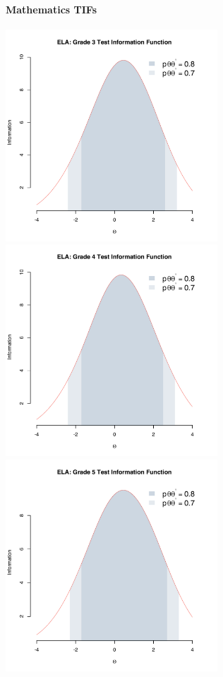 \documentclass[]{article}
\let\oldparagraph\paragraph
\renewcommand{\paragraph}[1]{\oldparagraph{#1}\mbox{}}
\begin{document}
\paragraph{Mathematics TIFs}\label{mathematics-tifs}

\FloatBarrier
\includegraphics[height=3.12500in]{tifs/ela3tif.pdf}
\includegraphics[height=3.12500in]{tifs/ela4tif.pdf}
\includegraphics[height=3.12500in]{tifs/ela5tif.pdf}
\end{document}
